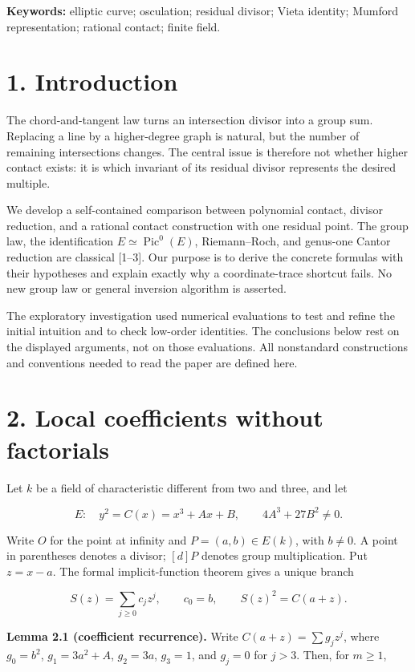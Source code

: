 \documentclass[
  11pt,
  a4paper,
]{article}
\begin{document}
\textbf{Keywords:} elliptic curve; osculation; residual divisor; Vieta
identity; Mumford representation; rational contact; finite field.

\section{1. Introduction}\label{introduction}

The chord-and-tangent law turns an intersection divisor into a group
sum. Replacing a line by a higher-degree graph is natural, but the
number of remaining intersections changes. The central issue is
therefore not whether higher contact exists: it is which invariant of
its residual divisor represents the desired multiple.

We develop a self-contained comparison between polynomial contact,
divisor reduction, and a rational contact construction with one residual
point. The group law, the identification
\(E\simeq\operatorname{Pic}^0(E)\), Riemann--Roch, and genus-one Cantor
reduction are classical {[}1--3{]}. Our purpose is to derive the
concrete formulas with their hypotheses and explain exactly why a
coordinate-trace shortcut fails. No new group law or general inversion
algorithm is asserted.

The exploratory investigation used numerical evaluations to test and
refine the initial intuition and to check low-order identities. The
conclusions below rest on the displayed arguments, not on those
evaluations. All nonstandard constructions and conventions needed to
read the paper are defined here.

\section{2. Local coefficients without
factorials}\label{local-coefficients-without-factorials}

Let \(k\) be a field of characteristic different from two and three, and
let

\[
E:\quad y^2=C(x)=x^3+Ax+B,\qquad 4A^3+27B^2\neq0.
\]

Write \(O\) for the point at infinity and \(P=(a,b)\in E(k)\), with
\(b\neq0\). A point in parentheses denotes a divisor; \([d]P\) denotes
group multiplication. Put \(z=x-a\). The formal implicit-function
theorem gives a unique branch

\[
S(z)=\sum_{j\geq0}c_jz^j,\qquad c_0=b,\qquad S(z)^2=C(a+z).
\]

\textbf{Lemma 2.1 (coefficient recurrence).} Write
\(C(a+z)=\sum g_jz^j\), where \(g_0=b^2\), \(g_1=3a^2+A\), \(g_2=3a\),
\(g_3=1\), and \(g_j=0\) for \(j>3\). Then, for \(m\geq1\),
\end{document}
